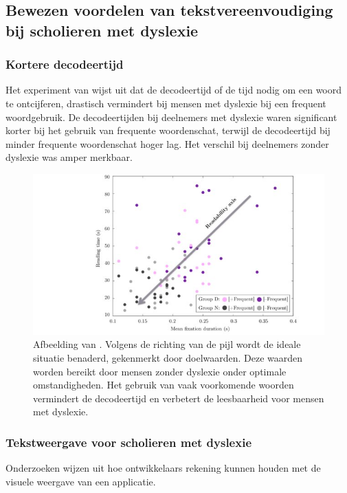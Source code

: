 \subsection{Bewezen voordelen van tekstvereenvoudiging bij scholieren met dyslexie}

\subsubsection{Kortere decodeertijd}

Het experiment van \textcite{Rello2013a} wijst uit dat de decodeertijd of de tijd nodig om een woord te ontcijferen, drastisch vermindert bij mensen met dyslexie bij een frequent woordgebruik. De decodeertijden bij deelnemers met dyslexie waren significant korter bij het gebruik van frequente woordenschat, terwijl de decodeertijd bij minder frequente woordenschat hoger lag. Het verschil bij deelnemers zonder dyslexie was amper merkbaar.

\begin{figure}
	\includegraphics[width=\linewidth]{img/readability-mean-fixation-duration.png}
	\caption{Afbeelding van \textcite{Rello2013a}. Volgens de richting van de pijl wordt de ideale situatie benaderd, gekenmerkt door doelwaarden. Deze waarden worden bereikt door mensen zonder dyslexie onder optimale omstandigheden. Het gebruik van vaak voorkomende woorden vermindert de decodeertijd en verbetert de leesbaarheid voor mensen met dyslexie.}
\end{figure}

\subsubsection{Tekstweergave voor scholieren met dyslexie}

Onderzoeken wijzen uit hoe ontwikkelaars rekening kunnen houden met de visuele weergave van een applicatie.

